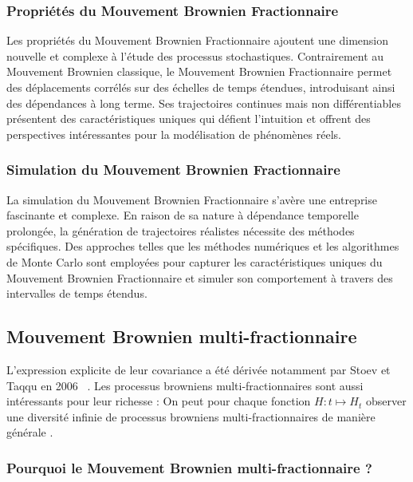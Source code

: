 \subsubsection{Propriétés du Mouvement Brownien Fractionnaire}

Les propriétés du Mouvement Brownien Fractionnaire ajoutent une dimension nouvelle et complexe à l'étude des processus stochastiques. Contrairement au Mouvement Brownien classique, le Mouvement Brownien Fractionnaire permet des déplacements corrélés sur des échelles de temps étendues, introduisant ainsi des dépendances à long terme. Ses trajectoires continues mais non différentiables présentent des caractéristiques uniques qui défient l'intuition et offrent des perspectives intéressantes pour la modélisation de phénomènes réels.

\subsubsection{Simulation du Mouvement Brownien Fractionnaire}

La simulation du Mouvement Brownien Fractionnaire s'avère une entreprise fascinante et complexe. En raison de sa nature à dépendance temporelle prolongée, la génération de trajectoires réalistes nécessite des méthodes spécifiques. Des approches telles que les méthodes numériques et les algorithmes de Monte Carlo sont employées pour capturer les caractéristiques uniques du Mouvement Brownien Fractionnaire et simuler son comportement à travers des intervalles de temps étendus.

\subsection{Mouvement Brownien multi-fractionnaire}

L'expression explicite de leur covariance a été dérivée notamment par Stoev et Taqqu en 2006 ~\cite{mfbm-howrich}. Les processus browniens multi-fractionnaires sont aussi intéressants pour leur \og richesse \fg : On peut pour chaque fonction $H : t \mapsto H_t$ observer \og une diversité infinie de processus browniens multi-fractionnaires de manière générale \fg.~\cite{mfbm-howrich}

\subsubsection{Pourquoi le Mouvement Brownien multi-fractionnaire ?}

